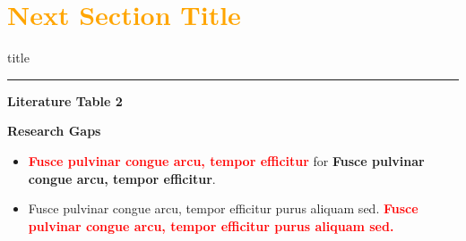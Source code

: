 \documentclass[aspectratio=169]{beamer}
\begin{document}
  
\section*{\textbf{\textcolor{orange}{Next Section Title}}}
    \begin{frame}[plain]
        \vfill
      \centering
      \begin{beamercolorbox}[sep=8pt,center,shadow=true,rounded=true]{title}
        \insertsectionhead\par%
        \color{oxfordblue}\noindent\rule{10cm}{1pt}
      \end{beamercolorbox}
      \vfill
  \end{frame}
  
\begin{frame}{\normalsize \textcolor{cmindsblue}{\textbf{Literature Table 2}}}
\vspace{-1.9cm}

\end{frame}


\begin{frame}{\textcolor{cmindsblue}{\textbf{Research Gaps}}}
    \begin{itemize}        
        \item \textcolor{red}{\textbf{Fusce pulvinar congue arcu, tempor efficitur}} for \textcolor{cmindsblue}{\textbf{Fusce pulvinar congue arcu, tempor efficitur}}.
        
        \item Fusce pulvinar congue arcu, tempor efficitur purus aliquam sed. \textcolor{red}{\textbf{Fusce pulvinar congue arcu, tempor efficitur purus aliquam sed.}}
    \end{itemize}
\end{frame}



\end{document}

